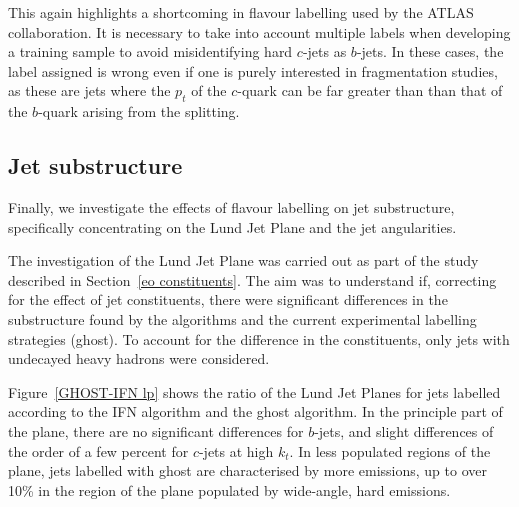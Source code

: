 \documentclass[10pt,a4paper]{book}
\begin{document}
This again highlights a shortcoming in flavour labelling used by the ATLAS collaboration. It is necessary to take into account multiple labels when developing a training sample to avoid misidentifying hard $c$-jets as $b$-jets. In these cases, the label assigned is wrong even if one is purely interested in fragmentation studies, as these are jets where the $p_t$ of the $c$-quark can be far greater than than that of the $b$-quark arising from the splitting. 

\subsection{Jet substructure}

Finally, we investigate the effects of flavour labelling on jet substructure, specifically concentrating on the Lund Jet Plane and the jet angularities. 

The investigation of the Lund Jet Plane was carried out as part of the study described in Section~\ref{eo constituents}. The aim was to understand if, correcting for the effect of jet constituents, there were significant differences in the substructure found by the algorithms and the current experimental labelling strategies (ghost). To account for the difference in the constituents, only jets with undecayed heavy hadrons were considered.

Figure~\ref{GHOST-IFN lp} shows the ratio of the Lund Jet Planes for jets labelled according to the IFN algorithm and the ghost algorithm. In the principle part of the plane, there are no significant differences for $b$-jets, and slight differences of the order of a few percent for $c$-jets at high $k_t$.  In less populated regions of the plane, jets labelled with ghost are characterised by more emissions, up to over 10\% in the region of the plane populated by wide-angle, hard emissions. 
\end{document}
